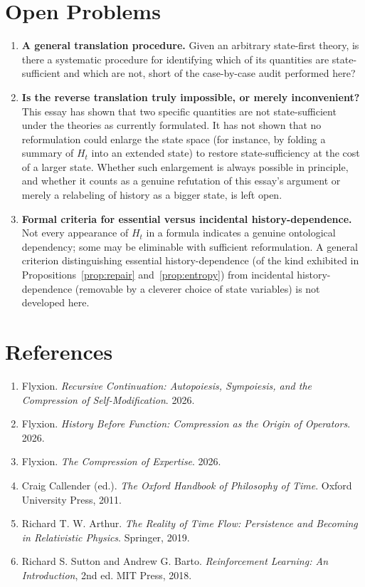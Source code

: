\documentclass[11pt]{article}
\begin{document}
\section*{Open Problems}

\begin{enumerate}
\item \textbf{A general translation procedure.} Given an arbitrary state-first theory, is there a systematic procedure for identifying which of its quantities are state-sufficient and which are not, short of the case-by-case audit performed here?
\item \textbf{Is the reverse translation truly impossible, or merely inconvenient?} This essay has shown that two specific quantities are not state-sufficient under the theories as currently formulated. It has not shown that no reformulation could enlarge the state space (for instance, by folding a summary of $H_t$ into an extended state) to restore state-sufficiency at the cost of a larger state. Whether such enlargement is always possible in principle, and whether it counts as a genuine refutation of this essay's argument or merely a relabeling of history as a bigger state, is left open.
\item \textbf{Formal criteria for essential versus incidental history-dependence.} Not every appearance of $H_t$ in a formula indicates a genuine ontological dependency; some may be eliminable with sufficient reformulation. A general criterion distinguishing essential history-dependence (of the kind exhibited in Propositions~\ref{prop:repair} and~\ref{prop:entropy}) from incidental history-dependence (removable by a cleverer choice of state variables) is not developed here.
\end{enumerate}

\section*{References}

\begin{enumerate}
\item Flyxion. \emph{Recursive Continuation: Autopoiesis, Sympoiesis, and the Compression of Self-Modification}. 2026.
\item Flyxion. \emph{History Before Function: Compression as the Origin of Operators}. 2026.
\item Flyxion. \emph{The Compression of Expertise}. 2026.
\item Craig Callender (ed.). \emph{The Oxford Handbook of Philosophy of Time}. Oxford University Press, 2011.
\item Richard T. W. Arthur. \emph{The Reality of Time Flow: Persistence and Becoming in Relativistic Physics}. Springer, 2019.
\item Richard S. Sutton and Andrew G. Barto. \emph{Reinforcement Learning: An Introduction}, 2nd ed. MIT Press, 2018.
\end{enumerate}
\end{document}
